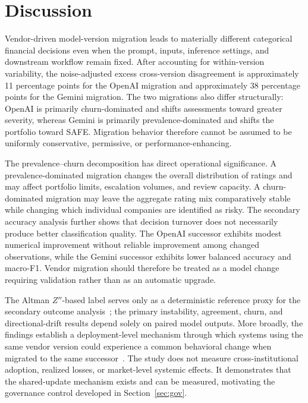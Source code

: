 \documentclass[11pt]{article}
\begin{document}
\section{Discussion}
\label{sec:disc}
Vendor-driven model-version migration leads to materially different categorical financial decisions even when the prompt, inputs, inference settings, and downstream workflow remain fixed. After accounting for within-version variability, the noise-adjusted excess cross-version disagreement is approximately 11 percentage points for the OpenAI migration and approximately 38 percentage points for the Gemini migration. The two migrations also differ structurally: OpenAI is primarily churn-dominated and shifts assessments toward greater severity, whereas Gemini is primarily prevalence-dominated and shifts the portfolio toward SAFE. Migration behavior therefore cannot be assumed to be uniformly conservative, permissive, or performance-enhancing.

The prevalence--churn decomposition has direct operational significance. A prevalence-dominated migration changes the overall distribution of ratings and may affect portfolio limits, escalation volumes, and review capacity. A churn-dominated migration may leave the aggregate rating mix comparatively stable while changing which individual companies are identified as risky. The secondary accuracy analysis further shows that decision turnover does not necessarily produce better classification quality. The OpenAI successor exhibits modest numerical improvement without reliable improvement among changed observations, while the Gemini successor exhibits lower balanced accuracy and macro-F1. Vendor migration should therefore be treated as a model change requiring validation rather than as an automatic upgrade.

The Altman $Z''$-based label serves only as a deterministic reference proxy for the secondary outcome analysis~\cite{altman_em}; the primary instability, agreement, churn, and directional-drift results depend solely on paired model outputs. More broadly, the findings establish a deployment-level mechanism through which systems using the same vendor version could experience a common behavioral change when migrated to the same successor~\cite{kim,monoculture,esrb}. The study does not measure cross-institutional adoption, realized losses, or market-level systemic effects. It demonstrates that the shared-update mechanism exists and can be measured, motivating the governance control developed in Section~\ref{sec:gov}.
\end{document}
